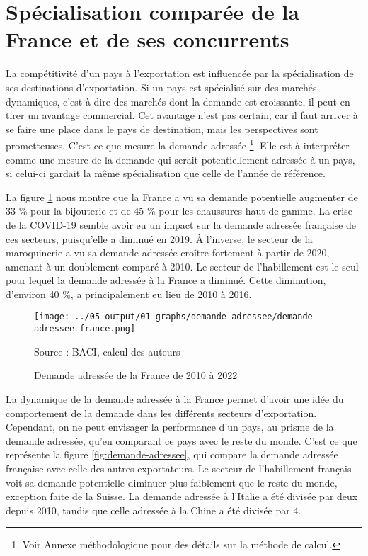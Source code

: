 \documentclass[french,10pt,a4paper]{article}
\begin{document}
\newpage
{}

\section{Spécialisation comparée de la France et de ses concurrents}


La compétitivité d'un pays à l'exportation est influencée par la spécialisation de ses destinations d'exportation. Si un pays est spécialisé sur des marchés dynamiques, c'est-à-dire des marchés dont la demande est croissante, il peut en tirer un avantage commercial. Cet avantage n'est pas certain, car il faut arriver à se faire une place dans le pays de destination, mais les perspectives sont prometteuses. C'est ce que mesure la demande adressée \footnote{Voir Annexe méthodologique pour des détails sur la méthode de calcul.}. Elle est à interpréter comme une mesure de la demande qui serait potentiellement adressée à un pays, si celui-ci gardait la même spécialisation que celle de l'année de référence.

La figure \ref{fig:demande-adressee-france} nous montre que la France a vu sa demande potentielle augmenter de 33 \% pour la bijouterie et de 45 \% pour les chaussures haut de gamme. La crise de la COVID-19 semble avoir eu un impact sur la demande adressée française de ces secteurs, puisqu'elle a diminué en 2019. À l'inverse, le secteur de la maroquinerie a vu sa demande adressée croître fortement à partir de 2020, amenant à un doublement comparé à 2010. Le secteur de l'habillement est le seul pour lequel la demande adressée à la France a diminué. Cette diminution, d'environ 40 \%, a principalement eu lieu de 2010 à 2016.

\begin{figure}[!h]
  \centering  \texttt{[image: ../05-output/01-graphs/demande-adressee/demande-adressee-france.png]}
  \captionsetup{justification=raggedright,singlelinecheck=false, font=small}
  \caption*{Source : BACI, calcul des auteurs}
  \captionsetup{justification=centering, singlelinecheck=true, font=normalsize}
  \caption{Demande adressée de la France de 2010 à 2022}
  \label{fig:demande-adressee-france}
\end{figure}

La dynamique de la demande adressée à la France permet d'avoir une idée du comportement de la demande dans les différents secteurs d'exportation. Cependant, on ne peut envisager la performance d'un pays, au prisme de la demande adressée, qu'en comparant ce pays avec le reste du monde. C'est ce que représente la figure \ref{fig:demande-adressee}, qui compare la demande adressée française avec celle des autres exportateurs. Le secteur de l'habillement français voit sa demande potentielle diminuer plus faiblement que le reste du monde, exception faite de la Suisse. La demande adressée à l'Italie a été divisée par deux depuis 2010, tandis que celle adressée à la Chine a été divisée par 4.
\end{document}
